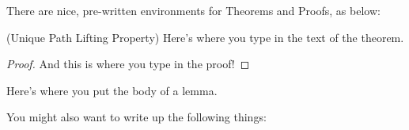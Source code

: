 \documentclass[12pt]{article}   %
\begin{document}
\noindent There are nice, pre-written environments for Theorems and Proofs,
as below:

\begin{theorem}{(Unique Path Lifting Property)}
Here's where you type in the text of the theorem.
\end{theorem}

\begin{proof}
And this is where you type in the proof!
\end{proof}

\begin{lemma}
{} %
Here's where you put the body of a lemma.
\end{lemma}

\bigskip

\noindent You might also want to write up the following things:
\end{document}
